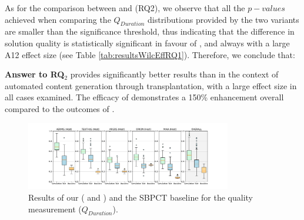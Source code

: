 As for the comparison between \simhotep{} and \timhotep{} (RQ2),  we observe that all the $p-values$ achieved when comparing the $Q_{Duration}$ distributions provided by the two \ApproachName{} variants are smaller than the significance threshold, thus indicating that the difference in solution quality is statistically significant in favour of \simhotep{}, and always with a large A12 effect size (see Table \ref{tab:resultsWilcEffRQ1}). Therefore, we conclude that:

\noindent  \textbf{Answer to RQ$_2$} \simhotep{} provides significantly better results than \timhotep{} in the context of automated content generation through transplantation, with a large effect size in all cases examined. The efficacy of \simhotep{} demonstrates a 150\% enhancement overall compared to the outcomes of \timhotep{}.

\begin{figure}[tb]
    \centering
    \includegraphics[width=0.8\textwidth]{Figures/Imhotep_with_legend_and_oracle_average-v4.pdf}
    \caption{Results of our \ApproachName{} (\simhotep{} and \timhotep{}) and the SBPCT baseline for the quality measurement ($Q_{Duration}$).}
    \label{fig:results}
\end{figure}